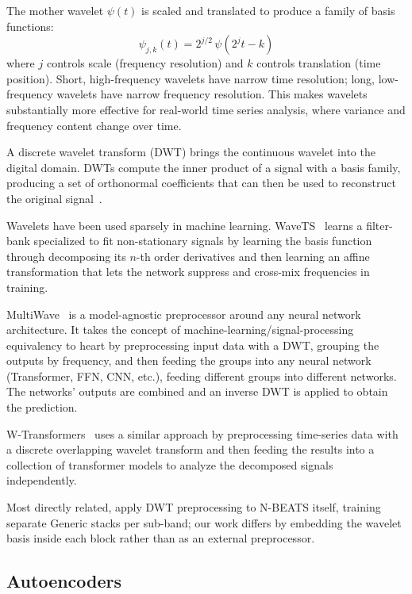 \documentclass[11pt,a4paper]{article}
\begin{document}
The mother wavelet $\psi(t)$ is scaled and translated to produce a family of basis functions:
\begin{equation*}
\psi_{j,k}(t) = 2^{j/2}\,\psi(2^j t - k)
\end{equation*}
where $j$ controls scale (frequency resolution) and $k$ controls translation (time position). Short, high-frequency wavelets have narrow time resolution; long, low-frequency wavelets have narrow frequency resolution. This makes wavelets substantially more effective for real-world time series analysis, where variance and frequency content change over time.

A discrete wavelet transform (DWT) brings the continuous wavelet into the digital domain. DWTs compute the inner product of a signal with a basis family, producing a set of orthonormal coefficients that can then be used to reconstruct the original signal~\citep{mallat1989wavelet,daubechies1992ten}.

Wavelets have been used sparsely in machine learning. WaveTS~\citep{zhou2025wavets} learns a filter-bank specialized to fit non-stationary signals by learning the basis function through decomposing its $n$-th order derivatives and then learning an affine transformation that lets the network suppress and cross-mix frequencies in training.

MultiWave~\citep{deznabi2023multiwave} is a model-agnostic preprocessor around any neural network architecture. It takes the concept of machine-learning/signal-processing equivalency to heart by preprocessing input data with a DWT, grouping the outputs by frequency, and then feeding the groups into any neural network (Transformer, FFN, CNN, etc.), feeding different groups into different networks. The networks' outputs are combined and an inverse DWT is applied to obtain the prediction.

W-Transformers~\citep{sasal2022wtransformers} uses a similar approach by preprocessing time-series data with a discrete overlapping wavelet transform and then feeding the results into a collection of transformer models to analyze the decomposed signals independently.

Most directly related, \citet{pramanick2024fusion} apply DWT preprocessing to N-BEATS itself, training separate Generic stacks per sub-band; our work differs by embedding the wavelet basis inside each block rather than as an external preprocessor.

\subsection{Autoencoders}
\end{document}
